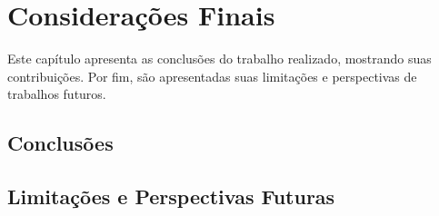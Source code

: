 \chapter{Considerações Finais}
\label{sec-conclusoes}

Este capítulo apresenta as conclusões do trabalho realizado, mostrando suas contribuições. Por fim, são apresentadas suas limitações e perspectivas de trabalhos futuros.

\section{Conclusões}
\label{sec-consideracoes-finais-conclusoes}


\section{Limitações e Perspectivas Futuras}
\label{sec-consideracoes-finais-limitacoes-perspectivas}